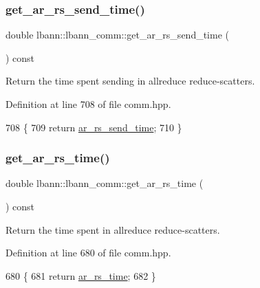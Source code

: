 \subsubsection{\texorpdfstring{get\+\_\+ar\+\_\+rs\+\_\+send\+\_\+time()}{get\_ar\_rs\_send\_time()}}
{\footnotesize\ttfamily double lbann\+::lbann\+\_\+comm\+::get\+\_\+ar\+\_\+rs\+\_\+send\+\_\+time (\begin{DoxyParamCaption}{ }\end{DoxyParamCaption}) const\hspace{0.3cm}{\ttfamily [inline]}}

Return the time spent sending in allreduce reduce-\/scatters. 

Definition at line 708 of file comm.\+hpp.


\begin{DoxyCode}
708                                             \{
709     \textcolor{keywordflow}{return} \hyperlink{classlbann_1_1lbann__comm_aaadab22d368e8004a9877828a3bc9e93}{ar\_rs\_send\_time};
710   \}
\end{DoxyCode}
\mbox{\label{classlbann_1_1lbann__comm_a3db95439bebabcc1648e50698d56dbaa}} 
\subsubsection{\texorpdfstring{get\+\_\+ar\+\_\+rs\+\_\+time()}{get\_ar\_rs\_time()}}
{\footnotesize\ttfamily double lbann\+::lbann\+\_\+comm\+::get\+\_\+ar\+\_\+rs\+\_\+time (\begin{DoxyParamCaption}{ }\end{DoxyParamCaption}) const\hspace{0.3cm}{\ttfamily [inline]}}

Return the time spent in allreduce reduce-\/scatters. 

Definition at line 680 of file comm.\+hpp.


\begin{DoxyCode}
680                                        \{
681     \textcolor{keywordflow}{return} \hyperlink{classlbann_1_1lbann__comm_a85022d803e339eb14a15129a07876c2b}{ar\_rs\_time};
682   \}
\end{DoxyCode}
\mbox{\label{classlbann_1_1lbann__comm_a2643a3713d7c2ed64851fc345ba2273f}} 
